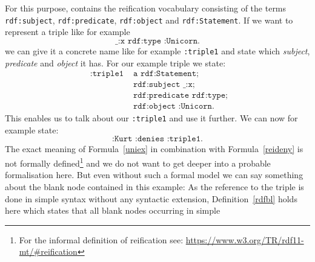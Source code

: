 For this purpose, \rdf contains the reification vocabulary consisting of the terms
%  
% 
% 
% 
% 
% 
% 
% 
\texttt{rdf:subject}, \texttt{rdf:predicate}, \texttt{rdf:object} and \texttt{rdf:Statement}. If we want to represent a triple like for example 
\begin{equation}
 \texttt{\_:x rdf:type :Unicorn.}
\end{equation}
we can give it a concrete name like for example \texttt{:triple1} and state which \emph{subject}, \emph{predicate} and \emph{object} it has. For our example triple we state:
% 
% 
\begin{equation} \label{uniex}
\begin{split}
\texttt{ :triple1 } & \texttt{a rdf:Statement;}\\
&\texttt{rdf:subject \_:x;}\\
&\texttt{rdf:predicate rdf:type;}\\
&\texttt{rdf:object :Unicorn.}
\end{split}
\end{equation}
This enables us to talk about our \texttt{:triple1} and use it further.
We can now for example state:
\begin{equation}\label{reideny}
\texttt{:Kurt :denies :triple1.} 
\end{equation}
The exact meaning of Formula~\ref{uniex} in combination with Formula~\ref{reideny} is not formally 
defined\footnote{For the informal definition of \rdf reification see: \url{https://www.w3.org/TR/rdf11-mt/\#reification}} and we do not want to get deeper into a probable 
formalisation here. But even without such a formal model we can say something about the blank node contained in this example: As the reference to the triple is done in simple \rdf syntax 
without any syntactic extension, Definition~\ref{rdfbl} holds here which states that all blank nodes occurring in simple \rdf 
